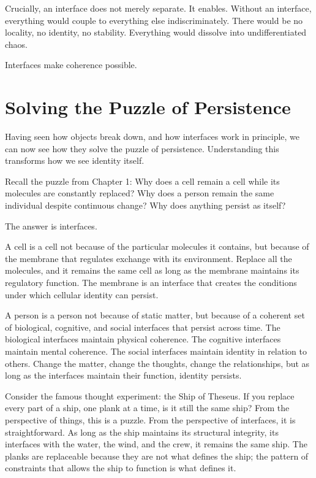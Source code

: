 \documentclass[
  openright]{book}
\begin{document}
Crucially, an interface does not merely separate. It enables. Without an
interface, everything would couple to everything else indiscriminately.
There would be no locality, no identity, no stability. Everything would
dissolve into undifferentiated chaos.

Interfaces make coherence possible.

\section{Solving the Puzzle of
Persistence}\label{solving-the-puzzle-of-persistence}

Having seen how objects break down, and how interfaces work in
principle, we can now see how they solve the puzzle of persistence.
Understanding this transforms how we see identity itself.

Recall the puzzle from Chapter 1: Why does a cell remain a cell while
its molecules are constantly replaced? Why does a person remain the same
individual despite continuous change? Why does anything
persist as itself?

The answer is interfaces.

A cell is a cell not because of the particular molecules it contains,
but because of the membrane that regulates exchange with its
environment. Replace all the molecules, and it remains the same cell as
long as the membrane maintains its regulatory function. The membrane is
an interface that creates the conditions under which cellular identity
can persist.

A person is a person not because of static matter, but because of a
coherent set of biological, cognitive, and social interfaces that
persist across time. The biological interfaces maintain physical
coherence. The cognitive interfaces maintain mental coherence. The
social interfaces maintain identity in relation to
others. Change the matter, change the thoughts, change the
relationships, but as long as the interfaces maintain their function,
identity persists.

Consider the famous thought experiment: the Ship
of Theseus. If you replace every part of a ship, one plank at a time, is
it still the same ship? From the perspective of things, this is a
puzzle. From the perspective of interfaces, it is straightforward. As
long as the ship maintains its structural integrity, its interfaces with
the water, the wind, and the crew, it remains the same ship. The planks
are replaceable because they are not what defines the ship; the pattern
of constraints that allows the ship to function is what defines it.
\end{document}
